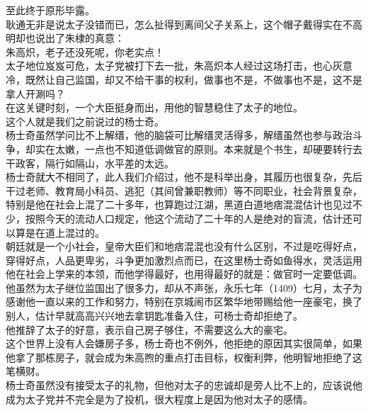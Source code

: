 \begin{multicols}{\theparacolNo}
至此终于原形毕露。\\

耿通无非是说太子没错而已，怎么扯得到离间父子关系上，这个帽子戴得实在不高明却也说出了朱棣的真意：\\

朱高炽，老子还没死呢，你老实点！\\

太子地位岌岌可危，太子党被打下去一批，朱高炽本人经过这场打击，也心灰意冷，既然让自己监国，却又不给干事的权利，做事也不是，不做事也不是，这不是拿人开涮吗？\\

在这关键时刻，一个大臣挺身而出，用他的智慧稳住了太子的地位。\\

这个人就是我们之前说过的杨士奇。\\

杨士奇虽然学问比不上解缙，他的脑袋可比解缙灵活得多，解缙虽然也参与政治斗争，却实在太嫩，一点也不知道低调做官的原则。本来就是个书生，却硬要转行去干政客，隔行如隔山，水平差的太远。\\

杨士奇就大不相同了，此人我们介绍过，他不是科举出身，其履历也很复杂，先后干过老师、教育局小科员、逃犯（其间曾兼职教师）等不同职业，社会背景复杂，特别是他在社会上混了二十多年，也算跑过江湖，黑道白道地痞混混估计也见过不少，按照今天的流动人口规定，他这个流动了二十年的人是绝对的盲流，估计还可以算是在道上混过的。\\

朝廷就是一个小社会，皇帝大臣们和地痞混混也没有什么区别，不过是吃得好点，穿得好点，人品更卑劣，斗争更加激烈点而已，在这里杨士奇如鱼得水，灵活运用他在社会上学来的本领，而他学得最好，也用得最好的就是：做官时一定要低调。\\

他虽然为太子继位监国出了很多力，却从不声张，永乐七年（1409）七月，太子为感谢他一直以来的工作和努力，特别在京城闹市区繁华地带赐给他一座豪宅，换了别人，估计早就高高兴兴地去拿钥匙准备入住，可杨士奇却拒绝了。\\

他推辞了太子的好意，表示自己房子够住，不需要这么大的豪宅。\\

这个世界上没有人会嫌房子多，杨士奇也不例外，他拒绝的原因其实很简单，如果他拿了那栋房子，就会成为朱高煦的重点打击目标，权衡利弊，他明智地拒绝了这笔横财。\\

杨士奇虽然没有接受太子的礼物，但他对太子的忠诚却是旁人比不上的，应该说他成为太子党并不完全是为了投机，很大程度上是因为他对太子的感情。\\


\end{multicols}

